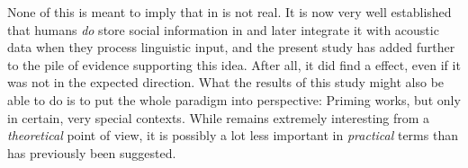 None of this is meant to imply that  in  is not real.
It is now very well established that humans \emph{do} store social information in  and later integrate it with acoustic data when they process linguistic input, and the present study has added further to the pile of evidence supporting this idea.
After all, it did find a  effect, even if it was not in the expected direction.
What the results of this study might also be able to do is to put the whole  paradigm into perspective: Priming works, but only in certain, very special contexts.
While   remains extremely interesting from a \emph{theoretical} point of view, it is possibly a lot less important in \emph{practical} terms than has previously been suggested.